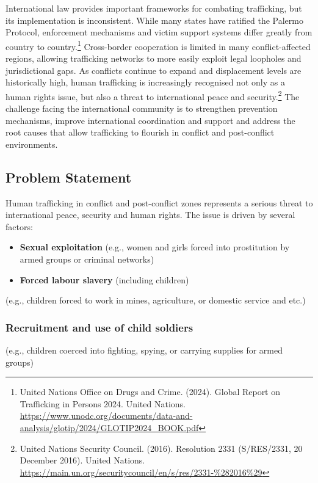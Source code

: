 International law provides important frameworks for combating trafficking, but its implementation is inconsistent. While many states have ratified the Palermo Protocol, enforcement mechanisms and victim support systems differ greatly from country to country.\footnote{United Nations Office on Drugs and Crime. (2024). Global Report on Trafficking in Persons 2024. United Nations. \url{https://www.unodc.org/documents/data-and-analysis/glotip/2024/GLOTIP2024_BOOK.pdf}} Cross-border cooperation is limited in many conflict-affected regions, allowing trafficking networks to more easily exploit legal loopholes and jurisdictional gaps. As conflicts continue to expand and displacement levels are historically high, human trafficking is increasingly recognised not only as a human rights issue, but also a threat to international peace and security.\footnote{United Nations Security Council. (2016). Resolution 2331 (S/RES/2331, 20 December 2016). United Nations. \url{https://main.un.org/securitycouncil/en/s/res/2331-\%282016\%29}} The challenge facing the international community is to strengthen prevention mechanisms, improve international coordination and support and address the root causes that allow trafficking to flourish in conflict and post-conflict environments.

\subsection{Problem Statement}

Human trafficking in conflict and post-conflict zones represents a serious threat to international peace, security and human rights. The issue is driven by several factors:

\begin{itemize}
  \item \textbf{Sexual exploitation} (e.g., women and girls forced into prostitution by armed groups or criminal networks)
  \item \textbf{Forced labour slavery} (including children)
\end{itemize}

(e.g., children forced to work in mines, agriculture, or domestic service and etc.)

\subsubsection{Recruitment and use of child soldiers}

(e.g., children coerced into fighting, spying, or carrying supplies for armed groups)

